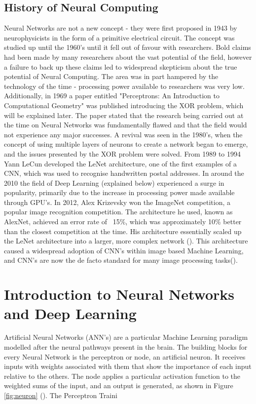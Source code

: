 \documentclass[12pt]{report}
\begin{document}
\subsection{History of Neural Computing}
\begin{flushleft}
Neural Networks are not a new concept - they were first proposed in 1943 by neurophysicists in the form of a primitive electrical circuit. The concept was studied up until the 1960's until it fell out of favour with researchers. Bold claims had been made by many researchers about the vast potential of the field, however a failure to back up these claims led to widespread skepticism about the true potential of Neural Computing. The area was in part hampered by the technology of the time - processing power available to researchers was very low. Additionally, in 1969 a paper entitled "Perceptrons: An Introduction to Computational Geometry" was published introducing the XOR problem, which will be explained later. The paper stated that the research being carried out at the time on Neural Networks was fundamentally flawed and that the field would not experience any major successes. A revival was seen in the 1980's, when the concept of using multiple layers of neurons to create a network began to emerge, and the issues presented by the XOR problem were solved. From 1989 to 1994 Yann LeCun developed the LeNet architecture, one of the first examples of a CNN, which was used to recognise handwritten postal addresses. In around the 2010 the field of Deep Learning (explained below) experienced a surge in popularity, primarily due to the increase in processing power made available through GPU's. In 2012, Alex Krizevsky won the ImageNet competition, a popular image recognition competition. The architecture he used, known as AlexNet, achieved an error rate of ~15\%, which was approximately 10\% better than the closest competition at the time. His architecture essentially scaled up the LeNet architecture into a larger, more complex network (\cite{krizhevsky2012imagenet}). This architecture caused a widespread adoption of CNN's within image based Machine Learning, and CNN's are now the de facto standard for many image processing tasks(\cite{o2015introduction}).
\end{flushleft}

\section{Introduction to Neural Networks and Deep Learning}

\begin{flushleft}
Artificial Neural Networks (ANN's) are a particular Machine Learning paradigm modelled after the neural pathways present in the brain. The building blocks for every Neural Network is the perceptron or node, an artificial neuron. It receives inputs with weights associated with them that show the importance of each input relative to the others. The node applies a particular activation function to the weighted sums of the input, and an output is generated, as shown in Figure \ref{fig:neuron} (\cite{geron2017hands}). The Perceptron Traini
\end{flushleft}
\end{document}
